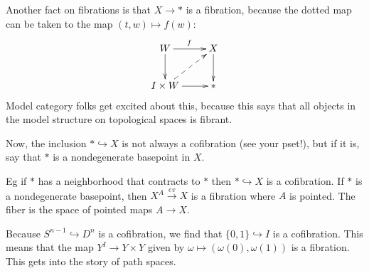 Another fact on fibrations is that $X\to \ast$ is a fibration, because the dotted map can be taken to the map $(t,w)\mapsto f(w)$:
\begin{equation*}
    \xymatrix{
    W\ar[d]\ar[r]^f & X\ar[d]\\
    I\times W\ar@{-->}[ur]\ar[r] & \ast
}
\end{equation*}
Model category folks get excited about this, because this says that all objects in the model structure on topological spaces is fibrant. 
\begin{definition}
Now, the inclusion $\ast\hookrightarrow X$ is not always a cofibration (see your pset!), but if it is, say that $\ast$ is a nondegenerate basepoint in $X$.
\end{definition}
Eg if $\ast$ has a neighborhood that contracts to $\ast$ then $\ast\hookrightarrow X$ is a cofibration. If $\ast$ is a nondegenerate basepoint, then $X^A\xrightarrow{ev} X$ is a fibration where $A$ is pointed. The fiber is the space of pointed maps $A\to X$.

Because $S^{n-1}\hookrightarrow D^n$ is a cofibration, we find that $\{0,1\}\hookrightarrow I$ is a cofibration. This means that the map $Y^I\to Y\times Y$ given by $\omega\mapsto (\omega(0),\omega(1))$ is a fibration. This gets into the story of path spaces.
